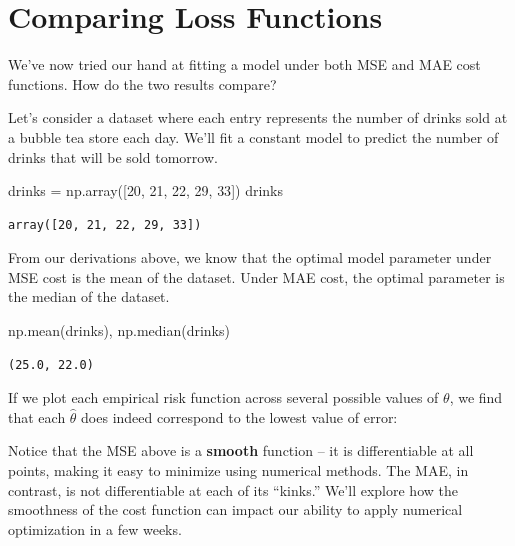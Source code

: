 \documentclass[
  letterpaper,
  DIV=11,
  numbers=noendperiod]{scrreprt}
\newenvironment{Shaded}{\begin{snugshade}}{\end{snugshade}}
\newcommand{\DecValTok}[1]{\textcolor[rgb]{0.68,0.00,0.00}{#1}}
\newcommand{\NormalTok}[1]{\textcolor[rgb]{0.00,0.23,0.31}{#1}}
\newcommand{\OperatorTok}[1]{\textcolor[rgb]{0.37,0.37,0.37}{#1}}
\begin{document}
\section{Comparing Loss Functions}\label{comparing-loss-functions}

We've now tried our hand at fitting a model under both MSE and MAE cost
functions. How do the two results compare?

Let's consider a dataset where each entry represents the number of
drinks sold at a bubble tea store each day. We'll fit a constant model
to predict the number of drinks that will be sold tomorrow.

\begin{Shaded}
\begin{Highlighting}[]
\NormalTok{drinks }\OperatorTok{=}\NormalTok{ np.array([}\DecValTok{20}\NormalTok{, }\DecValTok{21}\NormalTok{, }\DecValTok{22}\NormalTok{, }\DecValTok{29}\NormalTok{, }\DecValTok{33}\NormalTok{])}
\NormalTok{drinks}
\end{Highlighting}
\end{Shaded}

\begin{verbatim}
array([20, 21, 22, 29, 33])
\end{verbatim}

From our derivations above, we know that the optimal model parameter
under MSE cost is the mean of the dataset. Under MAE cost, the optimal
parameter is the median of the dataset.

\begin{Shaded}
\begin{Highlighting}[]
\NormalTok{np.mean(drinks), np.median(drinks)}
\end{Highlighting}
\end{Shaded}

\begin{verbatim}
(25.0, 22.0)
\end{verbatim}

If we plot each empirical risk function across several possible values
of \(\theta\), we find that each \(\hat{\theta}\) does indeed correspond
to the lowest value of error:

Notice that the MSE above is a \textbf{smooth} function -- it is
differentiable at all points, making it easy to minimize using numerical
methods. The MAE, in contrast, is not differentiable at each of its
``kinks.'' We'll explore how the smoothness of the cost function can
impact our ability to apply numerical optimization in a few weeks.
\end{document}

